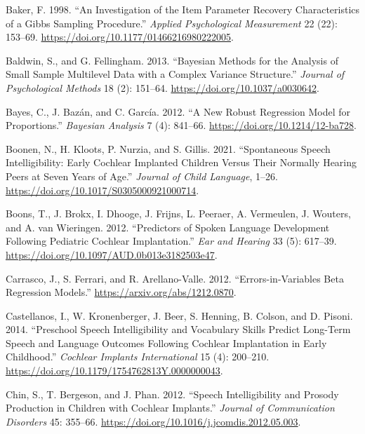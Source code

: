 \documentclass[
sn-apacite
]{sn-jnl}
\newlength{\cslhangindent}
\newenvironment{CSLReferences}[2] %
 {\begin{list}{}{%
  \setlength{\itemindent}{0pt}
  \setlength{\leftmargin}{0pt}
  \setlength{\parsep}{0pt}
  \ifodd #1
   \setlength{\leftmargin}{\cslhangindent}
   \setlength{\itemindent}{-1\cslhangindent}
  \fi
  \setlength{\itemsep}{#2\baselineskip}}}
 {\end{list}}
\begin{document}
\label{refs}
\begin{CSLReferences}{1}{0}
Baker, F. 1998. {``An Investigation of the Item Parameter Recovery
Characteristics of a Gibbs Sampling Procedure.''} \emph{Applied
Psychological Measurement} 22 (22): 153--69.
\url{https://doi.org/10.1177/01466216980222005}.

Baldwin, S., and G. Fellingham. 2013. {``Bayesian Methods for the
Analysis of Small Sample Multilevel Data with a Complex Variance
Structure.''} \emph{Journal of Psychological Methods} 18 (2): 151--64.
\url{https://doi.org/10.1037/a0030642}.

Bayes, C., J. Bazán, and C. García. 2012. {``A New Robust Regression
Model for Proportions.''} \emph{Bayesian Analysis} 7 (4): 841--66.
\url{https://doi.org/10.1214/12-ba728}.

Boonen, N., H. Kloots, P. Nurzia, and S. Gillis. 2021. {``Spontaneous
Speech Intelligibility: Early Cochlear Implanted Children Versus Their
Normally Hearing Peers at Seven Years of Age.''} \emph{Journal of Child
Language}, 1--26. \url{https://doi.org/10.1017/S0305000921000714}.

Boons, T., J. Brokx, I. Dhooge, J. Frijns, L. Peeraer, A. Vermeulen, J.
Wouters, and A. van Wieringen. 2012. {``Predictors of Spoken Language
Development Following Pediatric Cochlear Implantation.''} \emph{Ear and
Hearing} 33 (5): 617--39.
\url{https://doi.org/10.1097/AUD.0b013e3182503e47}.

Carrasco, J., S. Ferrari, and R. Arellano-Valle. 2012.
{``Errors-in-Variables Beta Regression Models.''}
\url{https://arxiv.org/abs/1212.0870}.

Castellanos, I., W. Kronenberger, J. Beer, S. Henning, B. Colson, and D.
Pisoni. 2014. {``Preschool Speech Intelligibility and Vocabulary Skills
Predict Long-Term Speech and Language Outcomes Following Cochlear
Implantation in Early Childhood.''} \emph{Cochlear Implants
International} 15 (4): 200--210.
\url{https://doi.org/10.1179/1754762813Y.0000000043}.

Chin, S., T. Bergeson, and J. Phan. 2012. {``Speech Intelligibility and
Prosody Production in Children with Cochlear Implants.''} \emph{Journal
of Communication Disorders} 45: 355--66.
\url{https://doi.org/10.1016/j.jcomdis.2012.05.003}.


\end{CSLReferences}
\end{document}
